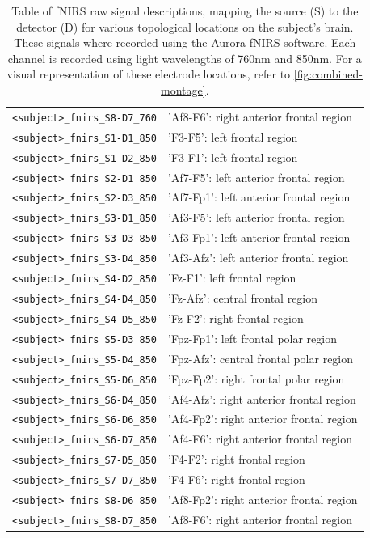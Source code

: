 \begin{table}
\begin{tabularx}{\textwidth}{lX}
  \texttt{<subject>\_fnirs\_S8-D7\_760} & 'Af8-F6': right anterior frontal region  \\
  \texttt{<subject>\_fnirs\_S1-D1\_850} & 'F3-F5': left frontal region  \\
  \texttt{<subject>\_fnirs\_S1-D2\_850} & 'F3-F1': left frontal region  \\
  \texttt{<subject>\_fnirs\_S2-D1\_850} & 'Af7-F5': left anterior frontal region  \\
  \texttt{<subject>\_fnirs\_S2-D3\_850} & 'Af7-Fp1': left anterior frontal region  \\
  \texttt{<subject>\_fnirs\_S3-D1\_850} & 'Af3-F5': left anterior frontal region  \\
  \texttt{<subject>\_fnirs\_S3-D3\_850} & 'Af3-Fp1': left anterior frontal region  \\
  \texttt{<subject>\_fnirs\_S3-D4\_850} & 'Af3-Afz': left anterior frontal region  \\
  \texttt{<subject>\_fnirs\_S4-D2\_850} & 'Fz-F1': left frontal region  \\
  \texttt{<subject>\_fnirs\_S4-D4\_850} & 'Fz-Afz': central frontal region  \\
  \texttt{<subject>\_fnirs\_S4-D5\_850} & 'Fz-F2': right frontal region  \\
  \texttt{<subject>\_fnirs\_S5-D3\_850} & 'Fpz-Fp1': left frontal polar region  \\
  \texttt{<subject>\_fnirs\_S5-D4\_850} & 'Fpz-Afz': central frontal polar region  \\
  \texttt{<subject>\_fnirs\_S5-D6\_850} & 'Fpz-Fp2': right frontal polar region  \\
  \texttt{<subject>\_fnirs\_S6-D4\_850} & 'Af4-Afz': right anterior frontal region  \\
  \texttt{<subject>\_fnirs\_S6-D6\_850} & 'Af4-Fp2': right anterior frontal region  \\
  \texttt{<subject>\_fnirs\_S6-D7\_850} & 'Af4-F6': right anterior frontal region  \\
  \texttt{<subject>\_fnirs\_S7-D5\_850} & 'F4-F2': right frontal region  \\
  \texttt{<subject>\_fnirs\_S7-D7\_850} & 'F4-F6': right frontal region  \\
  \texttt{<subject>\_fnirs\_S8-D6\_850} & 'Af8-Fp2': right anterior frontal region  \\
  \texttt{<subject>\_fnirs\_S8-D7\_850} & 'Af8-F6': right anterior frontal region  \\
  \bottomrule
  \end{tabularx}
  \caption{Table of fNIRS raw signal descriptions, mapping the source (S) to the detector (D) for various topological locations on the subject's brain. These signals where recorded using the Aurora fNIRS software. Each channel is recorded using light wavelengths of 760nm and 850nm. For a visual representation of these electrode locations, refer to \autoref{fig:combined-montage}.}
  \label{tab:fNIRS_raw_signals}
  \end{table}

